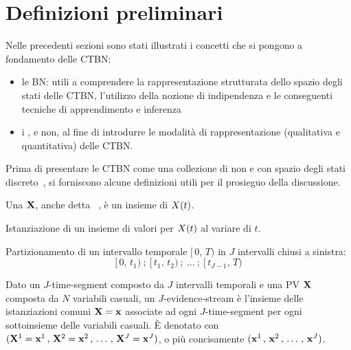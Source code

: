 \section{Definizioni preliminari}
\label{sec:Definizioni preliminari}
Nelle precedenti sezioni sono stati illustrati i concetti che si pongono a fondamento delle \acl{CTBN}:
\begin{itemize}
    \item le \acl{BN}: utili a comprendere la rappresentazione strutturata dello spazio degli stati delle \acs{CTBN}, l'utilizzo della nozione di indipendenza \cond*{} e le conseguenti tecniche di apprendimento e inferenza
    \item i \mprocess{}, \omog{} e non, al fine di introdurre le modalità di rappresentazione (qualitativa e quantitativa) delle \acs{CTBN}.
\end{itemize}

Prima di presentare le \acl{CTBN} come una collezione di \ctmp{} non \omog{} e con spazio degli stati discreto~\citep{Nodelman2007}, si forniscono alcune definizioni utili per il prosieguo della discussione.

\begin{definizione}[\acl{PV}]\label{defn:pv}
    Una \pv{} $\mathbf{X}$, anche detta ~\citep{Nodelman2007}, è un insieme di \ctmp{} $\mathnormal{X}(t)$.
\end{definizione}

\begin{definizione}[Traiettoria]
    Istanziazione di un insieme di valori per $\mathnormal{X}(t)$ al variare di $t$.
\end{definizione}

\begin{definizione}
Partizionamento di un intervallo temporale $[\,0,\,T)$ in $J$ intervalli chiusi a sinistra:
\[
[\,0,\,t_1)\:;\:[\,t_1,\,t_2)\:;\:\dotsc\:;\:[\,t_{J-1},\,T)
\]
\end{definizione}

\begin{definizione}
Dato un $J$-time-segment composto da $J$ intervalli temporali e una \acl{PV} $\mathbf{X}$ composta da $N$ variabili casuali, un $J$-evidence-stream è l'insieme delle istanziazioni comuni $\mathbf{X}=\mathbf{x}$ associate ad ogni $J$-time-segment per ogni sottoinsieme delle variabili casuali. \`E denotato con $(\mathbf{X}^1=\mathbf{x}^1\,,\,\mathbf{X}^2=\mathbf{x}^2\,,\,\dotsc\,,\,\mathbf{X}^J=\mathbf{x}^J)$, o più concisamente $(\mathbf{x}^1\,,\,\mathbf{x}^2\,,\,\dotsc\,,\,\mathbf{x}^J)$.
\end{definizione}

